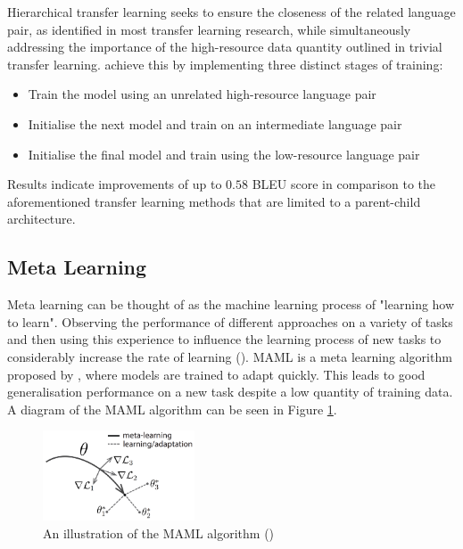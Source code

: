 Hierarchical transfer learning seeks to ensure the closeness of the related language pair, as identified in most transfer learning research, while simultaneously addressing the importance of the high-resource data quantity outlined in trivial transfer learning. \cite{luo_hierarchical_2019} achieve this by implementing three distinct stages of training:

\begin{itemize}
  \item Train the model using an unrelated high-resource language pair
  \item Initialise the next model and train on an intermediate language pair
  \item Initialise the final model and train using the low-resource language pair
\end{itemize}

Results indicate improvements of up to $0.58$ \acrshort{BLEU} score in comparison to the aforementioned transfer learning methods that are limited to a parent-child architecture.

\subsection{Meta Learning}
\label{sec-2:meta_learning}

Meta learning can be thought of as the machine learning process of "learning how to learn". Observing the performance of different approaches on a variety of tasks and then using this experience to influence the learning process of new tasks to considerably increase the rate of learning (\cite{vanschoren_meta-learning:_2018}).
\acrfull{MAML} is a meta learning algorithm proposed by \cite{finn_model-agnostic_2017}, where models are trained to adapt quickly. This leads to good generalisation performance on a new task despite a low quantity of training data.
A diagram of the \acrshort{MAML} algorithm can be seen in Figure \ref{fig:MAML}.

\begin{figure}[ht!]
\centering
\includegraphics[width=0.40\textwidth]{media/literature/nmt_approaches/maml.png}
\caption[\gls{MAML} algorithm]{An illustration of the \Gls{MAML} algorithm (\cite{finn_model-agnostic_2017})}
\label{fig:MAML}
\end{figure}

